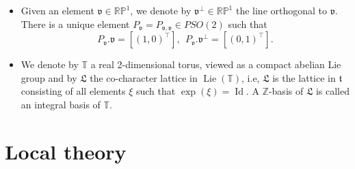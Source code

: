 \documentclass[a4paper,11pt]{amsart}
\theoremstyle{definition}
\numberwithin{equation}{section}
\newcommand{\R}{\mathbb{R}}
\newcommand{\dP}{\mathbb{P}}
\newcommand{\dT}{\mathbb{T}}
\newcommand{\mv} {\mathfrak v}
\newcommand{\mt} {\mathfrak t}
\newcommand{\mL} {\mathfrak L}
\newcommand{\bP}{\mathbb P}
\DeclareMathOperator{\Id}{Id}
\DeclareMathOperator{\Lie}{Lie}
\DeclareMathOperator{\bv}{{\bf v}}
\begin{document}
\begin{itemize}
We denote 
\begin{equation}\label{e:definition of alpha}
    \mv\wedge\mv':=\alpha.
\end{equation}
We also make a convention that $\mv\wedge \mv'=0$ if $\mv=\mv'$.
There is also a unique $\overline{P}_{\mv,\mv'}\in PSO_-(2)$ 
such that 
\begin{equation}
    \overline{P}_{\mv,\mv'}.\mv=\bv_{2/\alpha}, \quad \overline{P}_{\mv,\mv'}.\mv'=\bv_{-2/\alpha}.
\end{equation}
We have 
\begin{equation} \label{e:definition of bar P}
    \overline{P}_{\mv,\mv'}=R_1 P_{\mv,\mv'}.
\end{equation}
\item Given an element $\mv\in \R\bP^1$, we denote by $\mv^{\perp}\in \R\dP^1$ the  line orthogonal to $\mv$.  There is a unique element $P_{\mv}=P_{\mv, \mv}\in PSO(2)$ such that 
\begin{equation}\label{e:definition of P1}P_{\mv}.\mv=[(1, 0)^{\top}], \ \ P_{\mv}.\mv^{\perp}=[(0, 1)^{\top}].
\end{equation}


 \item We denote by $\dT$ a real 2-dimensional torus, viewed as a compact abelian Lie group and by  $\mL$ the co-character lattice in $\Lie(\dT)$, i.e, $\mL$ is the lattice in $\mt$ consisting of all elements $\xi$ such that $\exp(\xi)=\Id$. A $\mathbb Z$-basis of $\mL$ is called an integral basis of $\dT$.
 \end{itemize}
 
 
 
 
 
 

\section{Local theory}
\label{sec:dimension reduction}
\end{document}

